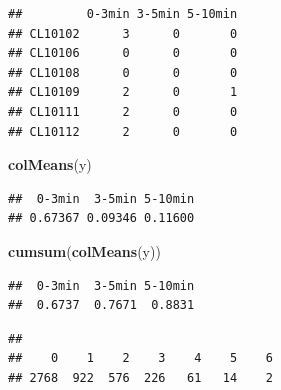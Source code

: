\documentclass[12pt,]{book}
\newenvironment{Shaded}{\begin{snugshade}}{\end{snugshade}}
\newcommand{\DataTypeTok}[1]{\textcolor[rgb]{0.13,0.29,0.53}{#1}}
\newcommand{\KeywordTok}[1]{\textcolor[rgb]{0.13,0.29,0.53}{\textbf{#1}}}
\newcommand{\NormalTok}[1]{#1}
\newcommand{\OperatorTok}[1]{\textcolor[rgb]{0.81,0.36,0.00}{\textbf{#1}}}
\newcommand{\StringTok}[1]{\textcolor[rgb]{0.31,0.60,0.02}{#1}}
\begin{document}
\begin{verbatim}
##         0-3min 3-5min 5-10min
## CL10102      3      0       0
## CL10106      0      0       0
## CL10108      0      0       0
## CL10109      2      0       1
## CL10111      2      0       0
## CL10112      2      0       0
\end{verbatim}

\begin{Shaded}
\begin{Highlighting}[]
\KeywordTok{colMeans}\NormalTok{(y)}
\end{Highlighting}
\end{Shaded}

\begin{verbatim}
##  0-3min  3-5min 5-10min 
## 0.67367 0.09346 0.11600
\end{verbatim}

\begin{Shaded}
\begin{Highlighting}[]
\KeywordTok{cumsum}\NormalTok{(}\KeywordTok{colMeans}\NormalTok{(y))}
\end{Highlighting}
\end{Shaded}

\begin{verbatim}
##  0-3min  3-5min 5-10min 
##  0.6737  0.7671  0.8831
\end{verbatim}

\begin{Shaded}
\end{Shaded}

\begin{verbatim}
## 
##    0    1    2    3    4    5    6 
## 2768  922  576  226   61   14    2
\end{verbatim}

\begin{Shaded}
\end{Shaded}
\end{document}
